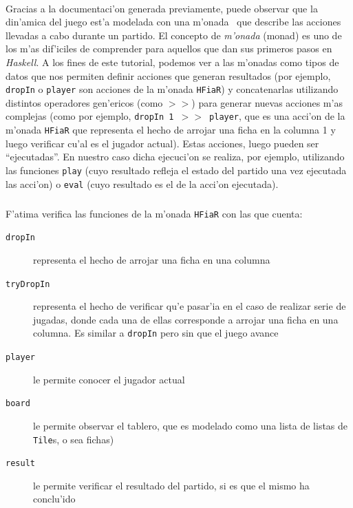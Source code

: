 \documentclass[a4paper]{article}
\newcommand{\haskell}{\textsl{Haskell}}
\begin{document}
\paragraph{}Gracias a la documentaci'on generada previamente, puede observar que la din'amica del juego est'a modelada con una m'onada~\cite{monads} que describe las acciones llevadas a cabo durante un partido.  El concepto de \textsl{m'onada} (monad) es uno de los m'as dif'iciles de comprender para aquellos que dan sus primeros pasos en \haskell.  A los fines de este tutorial, podemos ver a las m'onadas como tipos de datos que nos permiten definir acciones que generan resultados (por ejemplo, \texttt{dropIn} o \texttt{player} son acciones de la m'onada \texttt{HFiaR}) y concatenarlas utilizando distintos operadores gen'ericos (como \texttt{$>>$}) para generar nuevas acciones m'as complejas (como por ejemplo, \texttt{dropIn 1 $>>$ player}, que es una acci'on de la m'onada \texttt{HFiaR} que representa el hecho de arrojar una ficha en la columna 1 y luego verificar cu'al es el jugador actual).  Estas acciones, luego pueden ser ``ejecutadas''.  En nuestro caso dicha ejecuci'on se realiza, por ejemplo, utilizando las funciones \texttt{play} (cuyo resultado refleja el estado del partido una vez ejecutada las acci'on) o \texttt{eval} (cuyo resultado es el de la acci'on ejecutada).
\subparagraph{}F'atima verifica las funciones de la m'onada \texttt{HFiaR} con las que cuenta:
\begin{description}
	\item[\texttt{dropIn}] representa el hecho de arrojar una ficha en una columna
	\item[\texttt{tryDropIn}] representa el hecho de verificar qu'e pasar'ia en el caso de realizar serie de jugadas, donde cada una de ellas corresponde a arrojar una ficha en una columna.  Es similar a \texttt{dropIn} pero sin que el juego avance
	\item[\texttt{player}] le permite conocer el jugador actual
	\item[\texttt{board}] le permite observar el tablero, que es modelado como una lista de listas de \texttt{Tile}s, o sea fichas)
	\item[\texttt{result}] le permite verificar el resultado del partido, si es que el mismo ha conclu'ido
\end{description}
\end{document}
